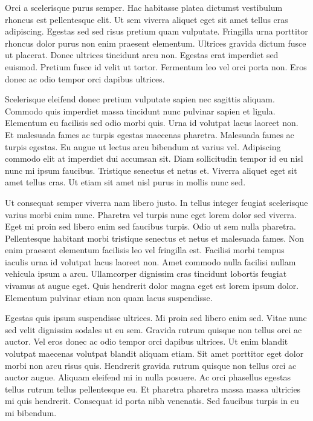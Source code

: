 \documentclass[11pt,a4paper]{article}
\begin{document}
Orci a scelerisque purus semper. Hac habitasse platea dictumst vestibulum rhoncus est pellentesque elit. Ut sem viverra aliquet eget sit amet tellus cras adipiscing. Egestas sed sed risus pretium quam vulputate. Fringilla urna porttitor rhoncus dolor purus non enim praesent elementum. Ultrices gravida dictum fusce ut placerat. Donec ultrices tincidunt arcu non. Egestas erat imperdiet sed euismod. Pretium fusce id velit ut tortor. Fermentum leo vel orci porta non. Eros donec ac odio tempor orci dapibus ultrices.

Scelerisque eleifend donec pretium vulputate sapien nec sagittis aliquam. Commodo quis imperdiet massa tincidunt nunc pulvinar sapien et ligula. Elementum eu facilisis sed odio morbi quis. Urna id volutpat lacus laoreet non. Et malesuada fames ac turpis egestas maecenas pharetra. Malesuada fames ac turpis egestas. Eu augue ut lectus arcu bibendum at varius vel. Adipiscing commodo elit at imperdiet dui accumsan sit. Diam sollicitudin tempor id eu nisl nunc mi ipsum faucibus. Tristique senectus et netus et. Viverra aliquet eget sit amet tellus cras. Ut etiam sit amet nisl purus in mollis nunc sed.

Ut consequat semper viverra nam libero justo. In tellus integer feugiat scelerisque varius morbi enim nunc. Pharetra vel turpis nunc eget lorem dolor sed viverra. Eget mi proin sed libero enim sed faucibus turpis. Odio ut sem nulla pharetra. Pellentesque habitant morbi tristique senectus et netus et malesuada fames. Non enim praesent elementum facilisis leo vel fringilla est. Facilisi morbi tempus iaculis urna id volutpat lacus laoreet non. Amet commodo nulla facilisi nullam vehicula ipsum a arcu. Ullamcorper dignissim cras tincidunt lobortis feugiat vivamus at augue eget. Quis hendrerit dolor magna eget est lorem ipsum dolor. Elementum pulvinar etiam non quam lacus suspendisse.

Egestas quis ipsum suspendisse ultrices. Mi proin sed libero enim sed. Vitae nunc sed velit dignissim sodales ut eu sem. Gravida rutrum quisque non tellus orci ac auctor. Vel eros donec ac odio tempor orci dapibus ultrices. Ut enim blandit volutpat maecenas volutpat blandit aliquam etiam. Sit amet porttitor eget dolor morbi non arcu risus quis. Hendrerit gravida rutrum quisque non tellus orci ac auctor augue. Aliquam eleifend mi in nulla posuere. Ac orci phasellus egestas tellus rutrum tellus pellentesque eu. Et pharetra pharetra massa massa ultricies mi quis hendrerit. Consequat id porta nibh venenatis. Sed faucibus turpis in eu mi bibendum.
\end{document}
